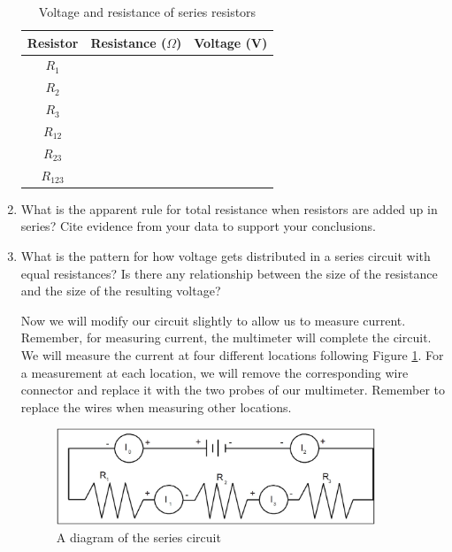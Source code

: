 \begin{enumerate}
	\begin{table}
	\begin{center}
	\begin{tabular}{| c | c | c |}
	\hline
		Resistor & Resistance ($\Omega$) & Voltage (V)\\
		\hline
		$R_1$ & &\\
		\hline
		$R_2$ & &\\
		\hline
		$R_3$ & &\\
		\hline
		$R_{12}$ & &\\
		\hline
		$R_{23}$ & &\\
		\hline
		$R_{123}$ & &\\
		\hline
	\end{tabular}
	\end{center}
	\caption{Voltage and resistance of series resistors}
	\label{tab:seriestable}
	\end{table}

	\item What is the apparent rule for total resistance when resistors are added up in series? Cite evidence from your data to support your conclusions.

	\item What is the pattern for how voltage gets distributed in a series circuit with equal resistances? Is there any relationship between the size of the resistance and the size of the resulting voltage?

\noindent Now we will modify our circuit slightly to allow us to measure current. Remember, for measuring current, the multimeter will complete the circuit. We will measure the current at four different locations following Figure \ref{fig:seriescurrent}. For a measurement at each location, we will remove the corresponding wire connector and replace it with the two probes of our multimeter. Remember to replace the wires when measuring other locations.

\begin{figure}[h]
\centering
\includegraphics[width=0.9\textwidth]{./Exp2/pic/seriescurrent.jpg}
\caption{A diagram of the series circuit}
\label{fig:seriescurrent}
\end{figure}


\end{enumerate}
